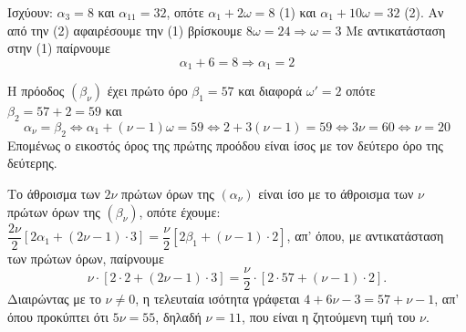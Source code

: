 
\begin{alist}
\item Ισχύουν: $\alpha_3 = 8$ και $\alpha_{11} = 32$, οπότε $\alpha_1 + 2\omega = 8$ (1) και $\alpha_1 + 10\omega = 32$ (2).
Αν από την (2) αφαιρέσουμε την (1) βρίσκουμε
$8\omega = 24 \Rightarrow \omega = 3$
Με αντικατάσταση στην (1) παίρνουμε
\[\alpha_1 + 6 = 8 \Rightarrow \alpha_1 = 2\]

\item Η πρόοδος $(\beta_\nu)$ έχει πρώτο όρο $\beta_1 = 57$ και διαφορά $\omega' = 2$ οπότε $\beta_2 = 57 + 2 = 59$ και
\[\alpha_\nu = \beta_2 \Leftrightarrow \alpha_1 + (\nu - 1)\omega = 59 \Leftrightarrow 2 + 3(\nu - 1) = 59 \Leftrightarrow 3\nu = 60 \Leftrightarrow \nu = 20\]
Επομένως ο εικοστός όρος της πρώτης προόδου είναι ίσος με τον δεύτερο όρο της δεύτερης.

\item Το άθροισμα των $2\nu$ πρώτων όρων της $(\alpha_\nu)$ είναι ίσο με το άθροισμα των $\nu$ πρώτων όρων
της $(\beta_\nu)$, οπότε έχουμε: $\dfrac{2\nu}{2}[2\alpha_1 + (2\nu - 1) \cdot 3] = \dfrac{\nu}{2}[2\beta_1 + (\nu - 1) \cdot 2]$, απ’ όπου, με αντικατάσταση των πρώτων όρων, παίρνουμε
\[\nu \cdot [2 \cdot 2 + (2\nu - 1) \cdot 3] = \dfrac{\nu}{2} \cdot [2 \cdot 57 + (\nu - 1) \cdot 2].\]
Διαιρώντας με το $\nu \ne 0$, η τελευταία ισότητα γράφεται $4 + 6\nu - 3 = 57 + \nu - 1$, απ’ όπου προκύπτει ότι $5\nu = 55$, δηλαδή
$\nu = 11$, που είναι η ζητούμενη τιμή του $\nu$.
\end{alist}

